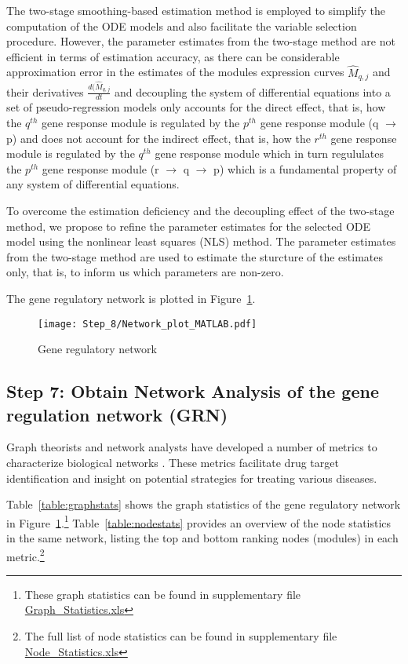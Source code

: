 \iffalse \textit{Refinement Step} \fi

The two-stage smoothing-based estimation method is employed to simplify the computation of the ODE models and also facilitate the variable selection procedure. However, the parameter estimates from the two-stage method are not efficient in terms of estimation accuracy, as there can be considerable approximation error in the estimates of the modules expression curves $\hat{M}_{q,j}$ and their derivatives $\frac{d(\hat{M}_{q,j}}{dt}$ and decoupling the system of differential equations into a set of pseudo-regression models only accounts for the direct effect, that is, how the $q^{th}$ gene response module is regulated by the $p^{th}$ gene response module (q $\rightarrow$ p) and does not account for the indirect effect, that is, how the $r^{th}$ gene response module is regulated by the $q^{th}$ gene response module which in turn regululates the $p^{th}$ gene response module (r $\rightarrow$ q $\rightarrow$ p) which is a fundamental property of any system of differential equations.

To overcome the estimation deficiency and the decoupling effect of the two-stage method, we propose to refine the parameter estimates for the selected ODE model using the nonlinear least squares (NLS) method. The parameter estimates from the two-stage method are used to estimate the sturcture of the estimates only, that is, to inform us which parameters are non-zero.

The gene regulatory network is plotted in Figure~\ref{fig:generegnet}.

\begin{figure}
\texttt{[image: Step\_8/Network\_plot\_MATLAB.pdf]}
\caption{Gene regulatory network}
\label{fig:generegnet}
\end{figure}


\subsection*{Step 7: Obtain Network Analysis of the gene regulation network (GRN)}

Graph theorists and network analysts have developed a number of metrics to characterize biological networks \cite{huber2007graphs, lee2004coexpression}. These metrics facilitate drug target identification and insight on potential strategies for treating various diseases.

Table~\ref{table:graphstats} shows the graph statistics of the gene regulatory network in Figure~\ref{fig:generegnet}.\footnote{These graph statistics can be found in supplementary file \href{Step_8/Graph\_Statistics.xls}{Graph\_Statistics.xls}} Table~\ref{table:nodestats} provides an overview of the node statistics in the same network, listing the top and bottom ranking nodes (modules) in each metric.\footnote{The full list of node statistics can be found in supplementary file \href{Step_8/Node\_Statistics.xls}{Node\_Statistics.xls}}



